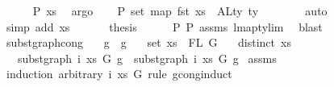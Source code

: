 \begin{isabellebody}
\ \ \ \ \isamarkupfalse%
\ P{}\ xs{}\ \isamarkupfalse%
\ argo\isanewline
\isanewline
\ \ \isamarkupfalse%
\ P{}{\isacharcolon}{\kern0pt}\ {\isachardoublequoteopen}set\ {\isacharparenleft}{\kern0pt}map\ fst\ xs{}{\isacharparenright}{\kern0pt}\ {\isasyminter}\ ALty\ ty\ {\isacharequal}{\kern0pt}\ {\isacharbraceleft}{\kern0pt}{\isacharbraceright}{\kern0pt}{\isachardoublequoteclose}\isanewline
\ \ \ \ \isamarkupfalse%
\ auto\isanewline
\ \ \ \ \isamarkupfalse%
\ {\isacharparenleft}{\kern0pt}simp\ add{\isacharcolon}{\kern0pt}\ xs{}{\isacharparenright}{\kern0pt}\isanewline
\ \ \isanewline
\ \ \isamarkupfalse%
\ {\isacharquery}{\kern0pt}thesis\isanewline
\ \ \ \ \isamarkupfalse%
\ P{}\ P{}\ assms{\isacharparenleft}{\kern0pt}{}{\isacharcomma}{\kern0pt}{}{\isacharparenright}{\kern0pt}\ lmap{\isacharunderscore}{\kern0pt}ty{\isacharunderscore}{\kern0pt}lim{}\ \isamarkupfalse%
\ blast\isanewline
{}\isamarkupfalse%
%
\endisatagproof
{\isafoldproof}%
%
\isadelimproof
%
\endisadelimproof
%
\isadelimdocument
%
\endisadelimdocument
%
\isatagdocument
%
\isamarkuptrue%
%
\endisatagdocument
{\isafolddocument}%
%
\isadelimdocument
%
\endisadelimdocument
{}\isamarkupfalse%
\ subst{\isacharunderscore}{\kern0pt}graph{\isacharunderscore}{\kern0pt}cong{\isacharcolon}{\kern0pt}\isanewline
\ \ \ {\isachardoublequoteopen}g{}\ {\isasymsimeq}\ g{}{\isachardoublequoteclose}\isanewline
\ \ \ {\isachardoublequoteopen}set\ xs\ {\isacharequal}{\kern0pt}\ FL\ G{\isachardoublequoteclose}\isanewline
\ \ \ {\isachardoublequoteopen}distinct\ xs{\isachardoublequoteclose}\isanewline
\ \ \ {\isachardoublequoteopen}subst{\isacharunderscore}{\kern0pt}graph\ i\ xs\ G\ g{}\ {\isasymsimeq}\ subst{\isacharunderscore}{\kern0pt}graph\ i\ xs\ G\ g{}{\isachardoublequoteclose}\isanewline
%
\isadelimproof
%
\endisadelimproof
%
\isatagproof
{}\isamarkupfalse%
\ assms\isanewline
{}\isamarkupfalse%
\ {\isacharparenleft}{\kern0pt}induction\ arbitrary{\isacharcolon}{\kern0pt}\ i\ xs\ G\ rule{\isacharcolon}{\kern0pt}\ gcong{\isachardot}{\kern0pt}induct{\isacharparenright}{\kern0pt}\isanewline

\end{isabellebody}
